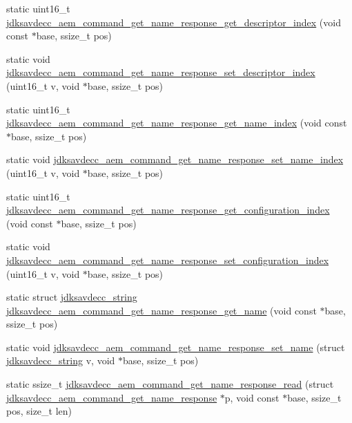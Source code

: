 \begin{DoxyCompactItemize}
\item 
static uint16\+\_\+t \hyperlink{group__command__get__name__response_gace444f9fe92f80bf52c6d3d9199e7b38}{jdksavdecc\+\_\+aem\+\_\+command\+\_\+get\+\_\+name\+\_\+response\+\_\+get\+\_\+descriptor\+\_\+index} (void const $\ast$base, ssize\+\_\+t pos)
\item 
static void \hyperlink{group__command__get__name__response_ga1412e1a588790875ef89fef53b0f72d9}{jdksavdecc\+\_\+aem\+\_\+command\+\_\+get\+\_\+name\+\_\+response\+\_\+set\+\_\+descriptor\+\_\+index} (uint16\+\_\+t v, void $\ast$base, ssize\+\_\+t pos)
\item 
static uint16\+\_\+t \hyperlink{group__command__get__name__response_ga4eaa5da4dc701f3f417f9608c87a662a}{jdksavdecc\+\_\+aem\+\_\+command\+\_\+get\+\_\+name\+\_\+response\+\_\+get\+\_\+name\+\_\+index} (void const $\ast$base, ssize\+\_\+t pos)
\item 
static void \hyperlink{group__command__get__name__response_ga0f05ec362145a4d41d4f8157b4392728}{jdksavdecc\+\_\+aem\+\_\+command\+\_\+get\+\_\+name\+\_\+response\+\_\+set\+\_\+name\+\_\+index} (uint16\+\_\+t v, void $\ast$base, ssize\+\_\+t pos)
\item 
static uint16\+\_\+t \hyperlink{group__command__get__name__response_ga02290070ea3ff9df2ea2276b2d105324}{jdksavdecc\+\_\+aem\+\_\+command\+\_\+get\+\_\+name\+\_\+response\+\_\+get\+\_\+configuration\+\_\+index} (void const $\ast$base, ssize\+\_\+t pos)
\item 
static void \hyperlink{group__command__get__name__response_ga5fb1dc9557314ab996b9a46a5ababcbd}{jdksavdecc\+\_\+aem\+\_\+command\+\_\+get\+\_\+name\+\_\+response\+\_\+set\+\_\+configuration\+\_\+index} (uint16\+\_\+t v, void $\ast$base, ssize\+\_\+t pos)
\item 
static struct \hyperlink{structjdksavdecc__string}{jdksavdecc\+\_\+string} \hyperlink{group__command__get__name__response_ga21c97683a7ff367f24d96b99794c007c}{jdksavdecc\+\_\+aem\+\_\+command\+\_\+get\+\_\+name\+\_\+response\+\_\+get\+\_\+name} (void const $\ast$base, ssize\+\_\+t pos)
\item 
static void \hyperlink{group__command__get__name__response_ga3f569841eb9681f611915aea7b1eafaf}{jdksavdecc\+\_\+aem\+\_\+command\+\_\+get\+\_\+name\+\_\+response\+\_\+set\+\_\+name} (struct \hyperlink{structjdksavdecc__string}{jdksavdecc\+\_\+string} v, void $\ast$base, ssize\+\_\+t pos)
\item 
static ssize\+\_\+t \hyperlink{group__command__get__name__response_ga0e8ecfaa03d14e2d8ade75cfec4d3bea}{jdksavdecc\+\_\+aem\+\_\+command\+\_\+get\+\_\+name\+\_\+response\+\_\+read} (struct \hyperlink{structjdksavdecc__aem__command__get__name__response}{jdksavdecc\+\_\+aem\+\_\+command\+\_\+get\+\_\+name\+\_\+response} $\ast$p, void const $\ast$base, ssize\+\_\+t pos, size\+\_\+t len)

\end{DoxyCompactItemize}
